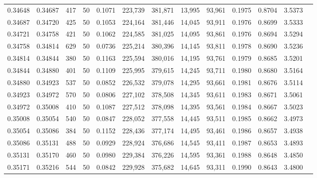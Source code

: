 \begin{tabular}{rrrrrrrrrrrrr}
0.34648 & 0.34687 &   417 &  50 &                                     0.1071 & 223,739 & 381,871 &  13,995 &  93,961 & 0.1975 & 0.8704 & 3.5373 \\
0.34687 & 0.34720 &   425 &  50 &                                     0.1053 & 224,164 & 381,446 &  14,045 &  93,911 & 0.1976 & 0.8699 & 3.5333 \\
0.34721 & 0.34758 &   421 &  50 &                                     0.1062 & 224,585 & 381,025 &  14,095 &  93,861 & 0.1976 & 0.8694 & 3.5294 \\
0.34758 & 0.34814 &   629 &  50 &                                     0.0736 & 225,214 & 380,396 &  14,145 &  93,811 & 0.1978 & 0.8690 & 3.5236 \\
0.34814 & 0.34844 &   380 &  50 &                                     0.1163 & 225,594 & 380,016 &  14,195 &  93,761 & 0.1979 & 0.8685 & 3.5201 \\
0.34844 & 0.34880 &   401 &  50 &                                     0.1109 & 225,995 & 379,615 &  14,245 &  93,711 & 0.1980 & 0.8680 & 3.5164 \\
0.34880 & 0.34923 &   537 &  50 &                                     0.0852 & 226,532 & 379,078 &  14,295 &  93,661 & 0.1981 & 0.8676 & 3.5114 \\
0.34923 & 0.34972 &   570 &  50 &                                     0.0806 & 227,102 & 378,508 &  14,345 &  93,611 & 0.1983 & 0.8671 & 3.5061 \\
0.34972 & 0.35008 &   410 &  50 &                                     0.1087 & 227,512 & 378,098 &  14,395 &  93,561 & 0.1984 & 0.8667 & 3.5023 \\
0.35008 & 0.35054 &   540 &  50 &                                     0.0847 & 228,052 & 377,558 &  14,445 &  93,511 & 0.1985 & 0.8662 & 3.4973 \\
0.35054 & 0.35086 &   384 &  50 &                                     0.1152 & 228,436 & 377,174 &  14,495 &  93,461 & 0.1986 & 0.8657 & 3.4938 \\
0.35086 & 0.35131 &   488 &  50 &                                     0.0929 & 228,924 & 376,686 &  14,545 &  93,411 & 0.1987 & 0.8653 & 3.4893 \\
0.35131 & 0.35170 &   460 &  50 &                                     0.0980 & 229,384 & 376,226 &  14,595 &  93,361 & 0.1988 & 0.8648 & 3.4850 \\
0.35171 & 0.35216 &   544 &  50 &                                     0.0842 & 229,928 & 375,682 &  14,645 &  93,311 & 0.1990 & 0.8643 & 3.4800 \\

\end{tabular}
